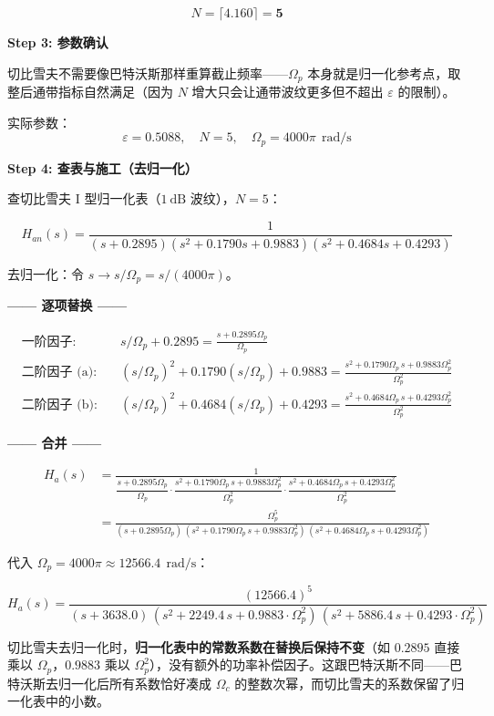 \documentclass[12pt,a4paper]{ctexart}
\newcommand{\Omegac}{\Omega_c}
\newcommand{\Omegap}{\Omega_p}
\newcommand{\db}{\ \mathrm{dB}}
\newcommand{\rads}{\ \mathrm{rad/s}}
\newcommand{\Han}{H_{\!a}(s)}
\newcommand{\HanNorm}{H_{\!an}(s)}
\newcommand{\ceil}[1]{\bigl\lceil #1 \bigr\rceil}
\begin{document}
\[
N = \ceil{4.160} = \mathbf{5}
\]

\vspace{4pt}

\textbf{\color{chebyshev!90}Step 3: 参数确认}

切比雪夫不需要像巴特沃斯那样重算截止频率——$\Omegap$ 本身就是归一化参考点，取整后通带指标自然满足（因为 $N$ 增大只会让通带波纹更多但不超出 $\varepsilon$ 的限制）。

实际参数：
\[
\varepsilon = 0.5088,\quad N = 5,\quad \Omega_p = 4000\pi\ \rads
\]

\textbf{\color{black!80}Step 4: 查表与施工（去归一化）}

查切比雪夫 I 型归一化表（$1\db$ 波纹），$N=5$：

\[
\HanNorm = \frac{1}{(s+0.2895)(s^2+0.1790s+0.9883)(s^2+0.4684s+0.4293)}
\]

去归一化：令 $s \to s/\Omegap = s/(4000\pi)$。

\textbf{—— 逐项替换 ——}

\begin{align*}
\text{一阶因子:}&\quad s/\Omegap + 0.2895
    = \frac{s + 0.2895\Omegap}{\Omegap} \\[4pt]
\text{二阶因子 (a):}&\quad (s/\Omegap)^2 + 0.1790(s/\Omegap) + 0.9883
    = \frac{s^2 + 0.1790\Omegap\,s + 0.9883\Omegap^2}{\Omegap^2} \\[4pt]
\text{二阶因子 (b):}&\quad (s/\Omegap)^2 + 0.4684(s/\Omegap) + 0.4293
    = \frac{s^2 + 0.4684\Omegap\,s + 0.4293\Omegap^2}{\Omegap^2}
\end{align*}

\textbf{—— 合并 ——}

\begin{align*}
\Han &= \frac{1}
    {\dfrac{s + 0.2895\Omegap}{\Omegap}
     \cdot \dfrac{s^2 + 0.1790\Omegap\,s + 0.9883\Omegap^2}{\Omegap^2}
     \cdot \dfrac{s^2 + 0.4684\Omegap\,s + 0.4293\Omegap^2}{\Omegap^2}} \\[8pt]
    &= \frac{\Omegap^5}
       {(s + 0.2895\Omegap)\,
        (s^2 + 0.1790\Omegap\,s + 0.9883\Omegap^2)\,
        (s^2 + 0.4684\Omegap\,s + 0.4293\Omegap^2)}
\end{align*}

代入 $\Omegap = 4000\pi \approx 12566.4\ \rads$：

\[
\boxed{\displaystyle
\Han = \frac{(12566.4)^5}
    {(s + 3638.0)\,
    (s^2 + 2249.4\,s + 0.9883\cdot\Omegap^2)\,
    (s^2 + 5886.4\,s + 0.4293\cdot\Omegap^2)}
}
\]

\begin{pitfall}
切比雪夫去归一化时，\textbf{归一化表中的常数系数在替换后保持不变}（如 $0.2895$ 直接乘以 $\Omegap$，$0.9883$ 乘以 $\Omegap^2$），没有额外的功率补偿因子。这跟巴特沃斯不同——巴特沃斯去归一化后所有系数恰好凑成 $\Omegac$ 的整数次幂，而切比雪夫的系数保留了归一化表中的小数。
\end{pitfall}
\end{document}
